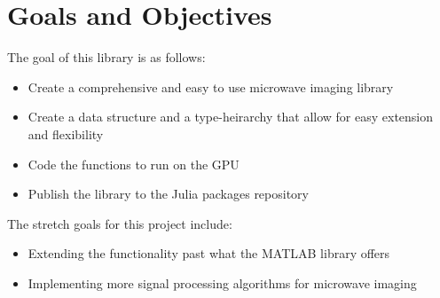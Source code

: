 \section*{Goals and Objectives}
The goal of this library is as follows:
\begin{itemize}
    \item Create a comprehensive and easy to use microwave imaging library
    \item Create a data structure and a type-heirarchy that allow for easy extension and flexibility
    \item Code the functions to run on the GPU
    \item Publish the library to the Julia packages repository \\
\end{itemize}
The stretch goals for this project include:
\begin{itemize}
    \item Extending the functionality past what the MATLAB library offers
    \item Implementing more signal processing algorithms for microwave imaging \\
\end{itemize}